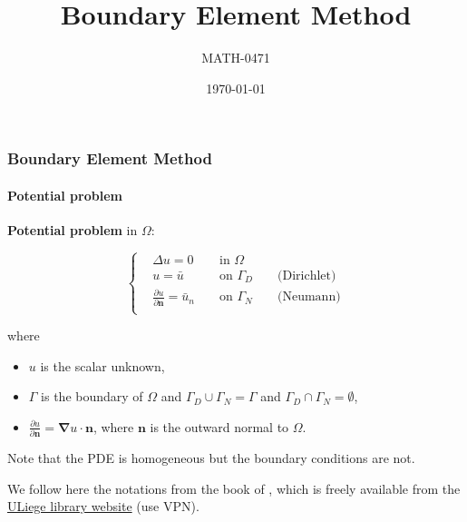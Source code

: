 \documentclass[10pt,xcolor=pdftex,dvipsnames,table]{beamer}
\title{Boundary Element Method}
\author{ MATH-0471 }
\date{\today}
\begin{document}
\frame{\titlepage}



\begin{frame}
	\frametitle{ Boundary Element Method }
	\framesubtitle{ Potential problem }
	
	\textbf{Potential problem} in $\Omega$:
	
	\begin{equation*}
		\left\{
		\begin{aligned}
		 &\Delta u = 0 &&\text{ in } \Omega  &&  \\
		&u = \bar{u} && \text{ on } \Gamma_D && \text{ (Dirichlet)}\\
		&\frac{\partial u}{\partial \boldsymbol{n}} = \bar{u}_n && \text{ on } \Gamma_N && \text{ (Neumann)} \\
		\end{aligned}
	\right.
	\end{equation*}
	
where 
\begin{itemize}
	\item $u$ is the scalar unknown, 
	\item $\Gamma$ is the boundary of $\Omega$ and $\Gamma_D \cup \Gamma_N = \Gamma$ and $\Gamma_D \cap \Gamma_N = \emptyset$,
	\item $\frac{\partial u}{\partial \boldsymbol{n}} = \boldsymbol{\nabla} u \cdot \boldsymbol{n}$, where $\boldsymbol{n}$ is the outward normal to $\Omega$.
\end{itemize}	

Note that the PDE is homogeneous but the boundary conditions are not.
	
	We follow here the notations from the book of \cite{Katsikadelis2016}, which is freely available from the \href{https://explore.lib.uliege.be/discovery/fulldisplay?docid=alma9919484598002321&context=L&vid=32ULG_INST:ULIEGE&lang=fr&search_scope=ULIEGE&adaptor=Local}{\color{blue}ULiege library website} (use VPN).

\end{frame}
\end{document}
